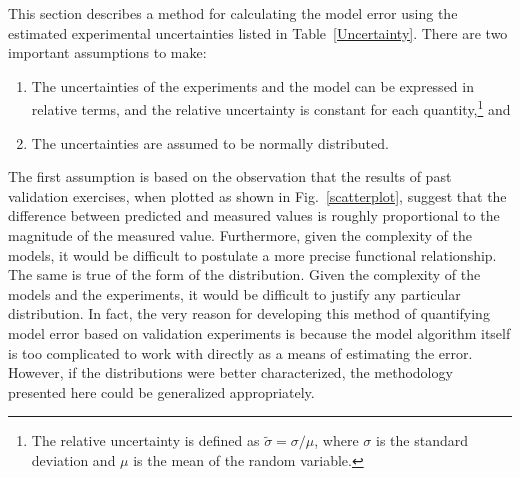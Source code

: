 This section describes a method for calculating the model error using the estimated experimental uncertainties
listed in Table~\ref{Uncertainty}.
There are two important assumptions to make:
\begin{enumerate}
\item The uncertainties of the experiments and the model can be expressed in
relative terms, and the relative uncertainty is constant for each quantity,\footnote{The relative uncertainty is defined as
$\widetilde{\sigma}=\sigma/\mu$, where $\sigma$ is the standard deviation and $\mu$ is the mean of the random variable.} and
\item The uncertainties are assumed to be normally distributed.
\end{enumerate}
The first assumption is based on the observation that the results of past validation exercises, when plotted as shown in Fig.~\ref{scatterplot}, suggest
that the difference between predicted and measured values is roughly proportional to the magnitude of the measured value. Furthermore, given the
complexity of the models, it would be difficult to postulate a more precise functional relationship.
The same is true of the form of the distribution. Given the complexity of the models and the experiments, it would be difficult to justify
any particular distribution. In fact, the very reason for developing this method of quantifying model error based on validation
experiments is because the model algorithm itself is too complicated to work with directly as a means of estimating the error. However, if
the distributions were better characterized, the methodology presented here could be generalized appropriately.

